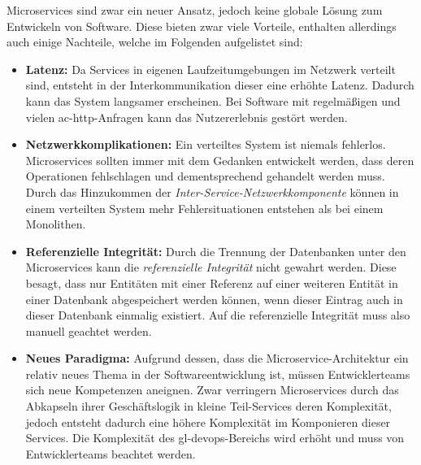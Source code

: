     Microservices sind zwar ein neuer Ansatz, jedoch keine globale Lösung zum Entwickeln von Software. Diese bieten zwar viele Vorteile, enthalten allerdings auch einige Nachteile, welche im Folgenden aufgelistet sind:
    \begin{itemize}
      \item \textbf{Latenz:} Da Services in eigenen Laufzeitumgebungen im Netzwerk verteilt sind, entsteht in der Interkommunikation dieser eine erhöhte Latenz. Dadurch kann das System langsamer erscheinen. Bei Software mit regelmäßigen und vielen \gls{ac-http}-Anfragen kann das Nutzererlebnis gestört werden.
      
      \item \textbf{Netzwerkkomplikationen:} Ein verteiltes System ist niemals fehlerlos. Microservices sollten immer mit dem Gedanken entwickelt werden, dass deren Operationen fehlschlagen und dementsprechend gehandelt werden muss. Durch das Hinzukommen der \emph{Inter-Service-Netzwerkkomponente} können in einem verteilten System mehr Fehlersituationen entstehen als bei einem Monolithen.
      
      \item \textbf{Referenzielle Integrität:} Durch die Trennung der Datenbanken unter den Microservices kann die \emph{referenzielle Integrität} nicht gewahrt werden. Diese besagt, dass nur Entitäten mit einer Referenz auf einer weiteren Entität in einer Datenbank abgespeichert werden können, wenn dieser Eintrag auch in dieser Datenbank einmalig existiert. Auf die referenzielle Integrität muss also manuell geachtet werden.
      
      \item \textbf{Neues Paradigma:} Aufgrund dessen, dass die Microservice-Architektur ein relativ neues Thema in der Softwareentwicklung ist, müssen Entwicklerteams sich neue Kompetenzen aneignen. Zwar verringern Microservices durch das Abkapseln ihrer Geschäftslogik in kleine Teil-Services deren Komplexität, jedoch entsteht dadurch eine höhere Komplexität im Komponieren dieser Services. Die Komplexität des \gls{gl-devops}-Bereichs wird erhöht und muss von Entwicklerteams beachtet werden.
    \end{itemize}
    \parencite[S. 22]{takai2017architektur}

